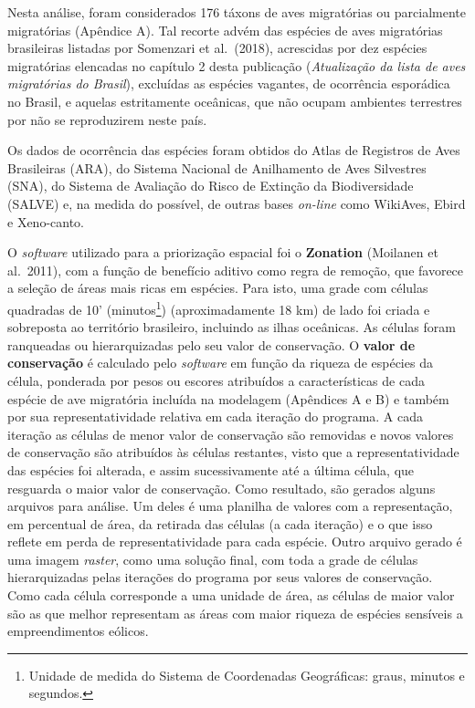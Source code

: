 \documentclass[
  oneside]{scrbook}
\begin{document}
Nesta análise, foram considerados 176 táxons de aves migratórias ou parcialmente migratórias (Apêndice A). Tal recorte advém das espécies de aves migratórias brasileiras listadas por Somenzari et al.~(2018), acrescidas por dez espécies migratórias elencadas no capítulo 2 desta publicação (\emph{Atualização da lista de aves migratórias do Brasil}), excluídas as espécies vagantes, de ocorrência esporádica no Brasil, e aquelas estritamente oceânicas, que não ocupam ambientes terrestres por não se reproduzirem neste país.

Os dados de ocorrência das espécies foram obtidos do Atlas de Registros de Aves Brasileiras (ARA), do Sistema Nacional de Anilhamento de Aves Silvestres (SNA), do Sistema de Avaliação do Risco de Extinção da Biodiversidade (SALVE) e, na medida do possível, de outras bases \emph{on-line} como WikiAves, Ebird e Xeno-canto.

O \emph{software} utilizado para a priorização espacial foi o \textbf{Zonation} (Moilanen et al.~2011), com a função de benefício aditivo como regra de remoção, que favorece a seleção de áreas mais ricas em espécies. Para isto, uma grade com células quadradas de 10' (minutos\footnote{Unidade de medida do Sistema de Coordenadas Geográficas: graus, minutos e segundos.}) (aproximadamente 18 km) de lado foi criada e sobreposta ao território brasileiro, incluindo as ilhas oceânicas. As células foram ranqueadas ou hierarquizadas pelo seu valor de conservação. O \textbf{valor de conservação} é calculado pelo \emph{software} em função da riqueza de espécies da célula, ponderada por pesos ou escores atribuídos a características de cada espécie de ave migratória incluída na modelagem (Apêndices A e B) e também por sua representatividade relativa em cada iteração do programa. A cada iteração as células de menor valor de conservação são removidas e novos valores de conservação são atribuídos às células restantes, visto que a representatividade das espécies foi alterada, e assim sucessivamente até a última célula, que resguarda o maior valor de conservação. Como resultado, são gerados alguns arquivos para análise. Um deles é uma planilha de valores com a representação, em percentual de área, da retirada das células (a cada iteração) e o que isso reflete em perda de representatividade para cada espécie. Outro arquivo gerado é uma imagem \emph{raster}, como uma solução final, com toda a grade de células hierarquizadas pelas iterações do programa por seus valores de conservação. Como cada célula corresponde a uma unidade de área, as células de maior valor são as que melhor representam as áreas com maior riqueza de espécies sensíveis a empreendimentos eólicos.
\end{document}
